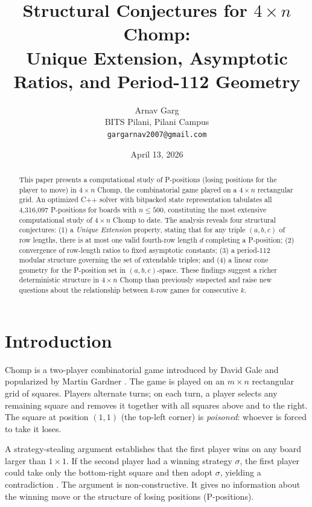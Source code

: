 \documentclass[12pt]{article}
\title{Structural Conjectures for $4 \times n$ Chomp:\\
Unique Extension, Asymptotic Ratios, and Period-112 Geometry}
\author{Arnav Garg \\
\small BITS Pilani, Pilani Campus \\
\small \texttt{gargarnav2007@gmail.com}}
\date{April 13, 2026}
\begin{document}
\maketitle

\begin{abstract}
This paper presents a computational study of P-positions (losing positions for
the player to move) in $4 \times n$ Chomp, the combinatorial game
played on a $4 \times n$ rectangular grid. An optimized C++ solver with
bitpacked state representation tabulates all 4,316,097 P-positions for
boards with $n \leq 500$, constituting the most extensive computational
study of $4 \times n$ Chomp to date. The analysis reveals four structural
conjectures: (1) a \emph{Unique Extension} property, stating that for any
triple $(a,b,c)$ of row lengths, there is at most one valid fourth-row
length $d$ completing a P-position; (2) convergence of row-length ratios
to fixed asymptotic constants; (3) a period-112 modular structure governing
the set of extendable triples; and (4) a linear cone geometry for the
P-position set in $(a,b,c)$-space. These findings suggest a richer
deterministic structure in $4 \times n$ Chomp than previously suspected
and raise new questions about the relationship between $k$-row games for
consecutive $k$.
\end{abstract}

\section{Introduction}

Chomp is a two-player combinatorial game introduced by David Gale
\cite{gale1974} and popularized by Martin Gardner \cite{gardner1973}.
The game is played on an $m \times n$ rectangular grid of squares.
Players alternate turns; on each turn, a player selects any remaining
square and removes it together with all squares above and to the right.
The square at position $(1,1)$ (the top-left corner) is \emph{poisoned}:
whoever is forced to take it loses.

A strategy-stealing argument establishes that the first player wins on
any board larger than $1 \times 1$. If the second player had a winning
strategy $\sigma$, the first player could take only the bottom-right
square and then adopt $\sigma$, yielding a contradiction
\cite{berlekamp2001}. The argument is non-constructive. It gives no
information about the winning move or the structure of losing positions
(P-positions).
\end{document}
